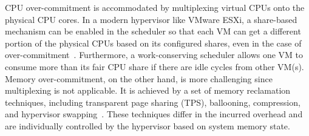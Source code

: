 CPU over-commitment is accommodated by multiplexing virtual 
CPUs onto the physical CPU cores. In a modern hypervisor like VMware ESXi, a share-based mechanism can be enabled  
in the scheduler so that each VM can get a different portion of the physical CPUs based on its configured shares, 
even in the case of over-commitment~\cite{vmware2013scheduler}. Furthermore, a work-conserving scheduler 
allows one VM to consume more than its fair CPU share if there are idle cycles from other VM(s). 
Memory over-commitment, on the other hand, is more challenging since multiplexing is not 
applicable. It is achieved by a set of memory reclamation techniques, including transparent page sharing (TPS), 
ballooning, compression, and hypervisor swapping~\cite{Waldspurger:2002:MRM:844128.844146,banerjee2013memory}. These techniques differ in the incurred 
overhead and are individually controlled by the hypervisor based on system memory state.  

